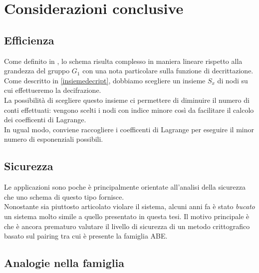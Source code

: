 \chapter{Considerazioni conclusive}



\section{Efficienza}
Come definito in \cite[4.3]{kpabe}, lo schema risulta complesso in maniera lineare rispetto alla grandezza del gruppo $G_1$ con una nota particolare sulla funzione di decrittazione.\\
Come descritto in \ref{insiemedecript}, dobbiamo scegliere un insieme $S_x$ di nodi su cui effettueremo la decifrazione.\\
La possibilità di scegliere questo insieme ci permettere di diminuire il numero di conti effettuati: vengono scelti i nodi con indice minore così da facilitare il calcolo dei coefficenti di Lagrange.\\
In ugual modo, conviene raccogliere i coefficenti di Lagrange per eseguire il minor numero di esponenziali possibili.


\section{Sicurezza}

Le applicazioni sono poche è principalmente orientate all'analisi della sicurezza che uno schema di questo tipo fornisce.\\
Nonostante sia piuttosto articolato violare il sistema, alcuni anni fa \cite{nict} è stato \emph{bucato} un sistema molto simile a quello presentato in questa tesi. Il motivo principale è che è ancora prematuro valutare il livello di sicurezza di un metodo crittografico basato sul pairing tra cui è presente la famiglia ABE.

\section{Analogie nella famiglia}

